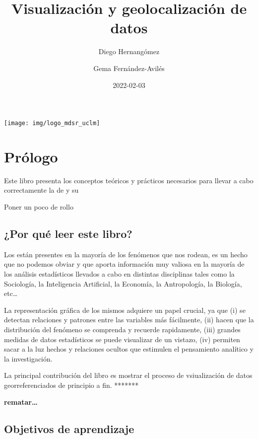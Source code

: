 \documentclass[
]{report}
\title{Visualización y geolocalización de datos}
\author{Diego Hernangómez \and Gema Fernández-Avilés}
\date{2022-02-03}
\theoremstyle{definition}
\theoremstyle{definition}
\theoremstyle{definition}
\theoremstyle{definition}
\theoremstyle{remark}
\begin{document}
\maketitle

{
\setcounter{tocdepth}{1}
\tableofcontents
}
\begin{center}\texttt{[image: img/logo\_mdsr\_uclm]} \end{center}

\hypertarget{pruxf3logo}{%
\chapter*{Prólogo}\label{pruxf3logo}}

Este libro presenta los conceptos teóricos y prácticos necesarios para llevar a
cabo correctamente la  de  y su

Poner un poco de rollo

\hypertarget{por-quuxe9-leer-este-libro}{%
\section*{¿Por qué leer este libro?}\label{por-quuxe9-leer-este-libro}}

Los  están presentes en la mayoría de los fenómenos
que nos rodean, es un hecho que no podemos obviar y que aporta información muy
valiosa en la mayoría de los análisis estadísticos llevados a cabo en distintas
disciplinas tales como la Sociología, la Inteligencia Artificial, la Economía,
la Antropología, la Biología, etc\ldots{}

La representación gráfica de los mismos adquiere un papel crucial, ya que (i) se
detectan relaciones y patrones entre las variables más fácilmente, (ii) hacen
que la distribución del fenómeno se comprenda y recuerde rapidamente, (iii)
grandes medidas de datos estadísticos se puede visualizar de un vistazo, (iv)
permiten sacar a la luz hechos y relaciones ocultos que estimulen el pensamiento
analítico y la investigación.

La principal contribución del libro es mostrar el proceso de vsiualización de
datos georreferenciados de principio a fin. *******

{\textbf{rematar\ldots{}}}

\hypertarget{objetivos-de-aprendizaje}{%
\section*{Objetivos de aprendizaje}\label{objetivos-de-aprendizaje}}
\end{document}
